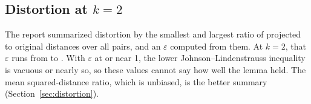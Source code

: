 \subsection{Distortion at $k = 2$}

The report summarized distortion by the smallest and largest ratio of projected to original distances over all pairs, and an $\varepsilon$ computed from them. At $k = 2$, that $\varepsilon$ runs from  to . With $\varepsilon$ at or near 1, the lower Johnson--Lindenstrauss inequality is vacuous or nearly so, so these values cannot say how well the lemma held. The mean squared-distance ratio, which is unbiased, is the better summary (Section~\ref{sec:distortion}).
